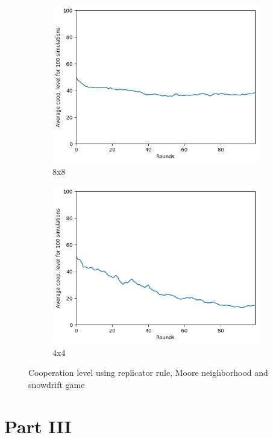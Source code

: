 \documentclass[letterpaper]{article}
\begin{document}
\begin{figure}[H]
\begin{subfigure}{.5\textwidth}
        \centering
        \includegraphics[width=1\linewidth]{images/assign2/8-part2}
        \caption{8x8}
        \label{fig:8moorepart2}
    \end{subfigure}
    \begin{subfigure}{.5\textwidth}
        \centering
        \includegraphics[width=1\linewidth]{images/assign2/4-part2}
        \caption{4x4}
        \label{fig:4moorepart2}
    \end{subfigure}
    \caption{Cooperation level using replicator rule, Moore neighborhood
    and snowdrift game}
    \label{fig:otherpart2}
\end{figure}


\section{Part III}
\end{document}
